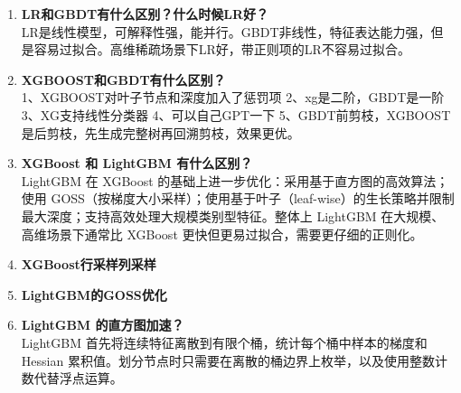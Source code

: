 \documentclass{article}
\begin{document}
\begin{enumerate}
1、集成学习：RF属于bagging，GBDT是boosting，一个是并行一个是串行，bagging优化的是方差，boosting优化的是偏差，RF不容易过拟合，boosting容易过拟合。

2、训练样本：RF是有放回抽样，GBDT训练使用全部样本

3、数据敏感性：RF对异常值敏感，GBDT对异常值不敏感

\item \textbf{LR和GBDT有什么区别？什么时候LR好？}\\
LR是线性模型，可解释性强，能并行。GBDT非线性，特征表达能力强，但是容易过拟合。高维稀疏场景下LR好，带正则项的LR不容易过拟合。

\item \textbf{XGBOOST和GBDT有什么区别？}\\
1、XGBOOST对叶子节点和深度加入了惩罚项
2、xg是二阶，GBDT是一阶
3、XG支持线性分类器
4、可以自己GPT一下
5、GBDT前剪枝，XGBOOST是后剪枝，先生成完整树再回溯剪枝，效果更优。
\item \textbf{XGBoost 和 LightGBM 有什么区别？}\\
LightGBM 在 XGBoost 的基础上进一步优化：采用基于直方图的高效算法；使用 GOSS（按梯度大小采样）；使用基于叶子（leaf-wise）的生长策略并限制最大深度；支持高效处理大规模类别型特征。整体上 LightGBM 在大规模、高维场景下通常比 XGBoost 更快但更易过拟合，需要更仔细的正则化。
\item \textbf{XGBoost行采样列采样}\\
\item \textbf{LightGBM的GOSS优化}\\
\item \textbf{LightGBM 的直方图加速？}\\
LightGBM 首先将连续特征离散到有限个桶，统计每个桶中样本的梯度和 Hessian 累积值。划分节点时只需要在离散的桶边界上枚举，以及使用整数计数代替浮点运算。

\end{enumerate}
\end{document}
